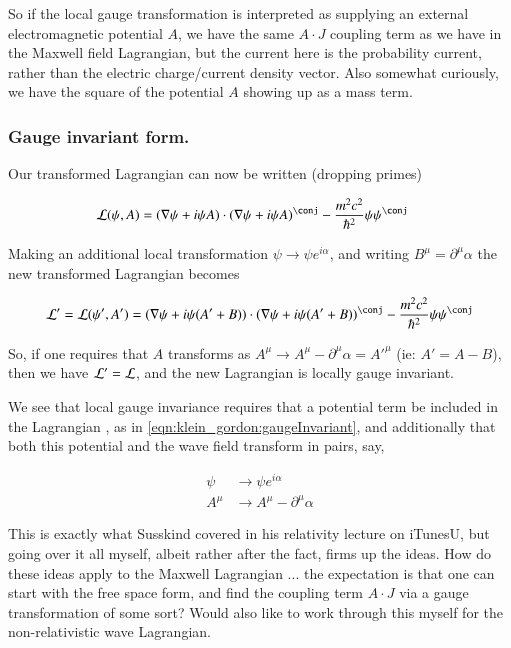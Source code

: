 So if the local gauge transformation is interpreted as supplying an external electromagnetic potential $A$, we have the same $A \cdot J$ coupling term
as we have in the Maxwell field Lagrangian, but the current here is the probability current, rather than the electric charge/current density vector.  Also
somewhat curiously, we have the square of the potential $A$ showing up as a mass term.

\subsubsection{Gauge invariant form. }

Our transformed Lagrangian can now be written (dropping primes)

\begin{align}\label{eqn:klein_gordon:gaugeInvariant}
\LL(\psi, A)
&=
(\grad \psi + i \psi A) \cdot (\grad \psi + i \psi A)^\conj
- \frac{m^2 c^2}{\hbar^2} \psi {\psi}^\conj
\end{align}

Making an additional local transformation $\psi \rightarrow \psi e^{i\alpha}$, and writing $B^\mu = \partial^\mu \alpha$ the new transformed Lagrangian becomes

\begin{align*}
\LL' = \LL(\psi', A')
&=
(\grad \psi + i \psi (A'+B)) \cdot (\grad \psi + i \psi (A'+B))^\conj
- \frac{m^2 c^2}{\hbar^2} \psi {\psi}^\conj \\
\end{align*}

So, if one requires that $A$ transforms as $A^\mu \rightarrow A^\mu - \partial^\mu \alpha = {A'}^\mu$ (ie: $A' = A - B$), then we have $\mathcal{L}' = \mathcal{L}$, and
the new Lagrangian is locally gauge invariant.

We see that local gauge invariance requires that a potential term be included in the Lagrangian
, as in \ref{eqn:klein_gordon:gaugeInvariant}, and additionally that both this potential and the wave field transform in pairs, say,

\begin{align}
\psi &\rightarrow \psi e^{i\alpha} \\
A^\mu &\rightarrow A^\mu - \partial^\mu \alpha
\end{align}

This is exactly what Susskind covered in his relativity lecture on iTunesU, but going over it all myself, albeit rather after the fact, firms up the ideas.  How
do these ideas apply to the Maxwell Lagrangian ... the expectation is that one can start with the free space form, and find the coupling term $A \cdot J$ via a
gauge transformation of some sort?  Would also like to work through this myself for the non-relativistic wave Lagrangian.


